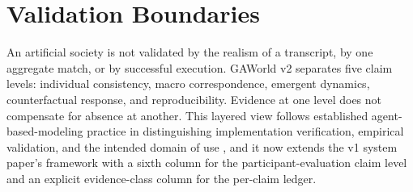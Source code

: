 \section{Validation Boundaries}
\label{sec:validation-boundaries}

An artificial society is not validated by the realism of a transcript, by one
aggregate match, or by successful execution.  GAWorld v2 separates five claim
levels: individual consistency, macro correspondence, emergent dynamics,
counterfactual response, and reproducibility.  Evidence at one level does not
compensate for absence at another.  This layered view follows established
agent-based-modeling practice in distinguishing implementation verification,
empirical validation, and the intended domain of use
\citep{grimm2006odd,windrum2007empirical,fagiolo2007critical}, and it now
extends the v1 system paper's framework with a sixth column for the
participant-evaluation claim level and an explicit evidence-class column
for the per-claim ledger.

